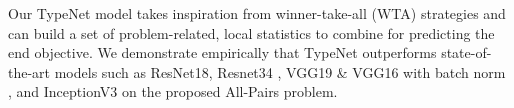 Our TypeNet model takes inspiration from winner-take-all (WTA)
strategies \cite{srivastava2013compete,maass2000computational} and can build a set of problem-related,
local statistics to combine for predicting the end
objective. We demonstrate empirically that TypeNet outperforms
state-of-the-art models such as ResNet18, Resnet34 \cite{he2016deep},
VGG19 \& VGG16 with batch norm \cite{simonyan2014very}, and InceptionV3
\cite{szegedy2016rethinking} on the proposed All-Pairs problem.

